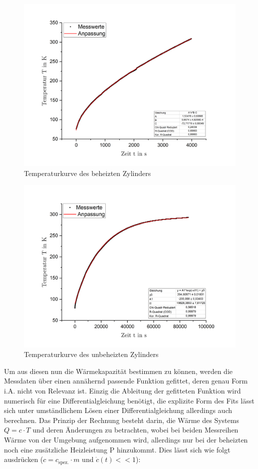 \documentclass{include/protokollclass}
\begin{document}
\begin{figure}[H]
    \centering
    \includegraphics[scale=0.5]{fig/A2HeizinK.png}
    \caption{Temperaturkurve des beheizten Zylinders}
    \label{fig:heiz}
\end{figure}
\begin{figure}[H]
    \centering
    \includegraphics[scale=0.5]{fig/A2RauminK.png}
    \caption{Temperaturkurve des unbeheizten Zylinders}
    \label{fig:raum}
\end{figure}
Um aus diesen nun die Wärmekapazität bestimmen zu können, werden die Messdaten über einen annähernd passende Funktion gefittet, deren genau Form i.A. nicht von Relevanz ist. Einzig die Ableitung der gefitteten Funktion wird numerisch für eine Differentialgleichung benötigt, die explizite Form des Fits lässt sich unter umständlichem Lösen einer Differentialgleichung allerdings auch berechnen. Das Prinzip der Rechnung besteht darin, die Wärme des Systems $Q=c \cdot T$ und deren Änderungen zu betrachten, wobei bei beiden Messreihen Wärme von der Umgebung aufgenommen wird, allerdings nur bei der beheizten noch eine zusätzliche Heizleistung P hinzukommt. Dies lässt sich wie folgt ausdrücken ($c = c_\text{spez.} \cdot m$ und $\dot{c}(t) << 1$):
\end{document}
